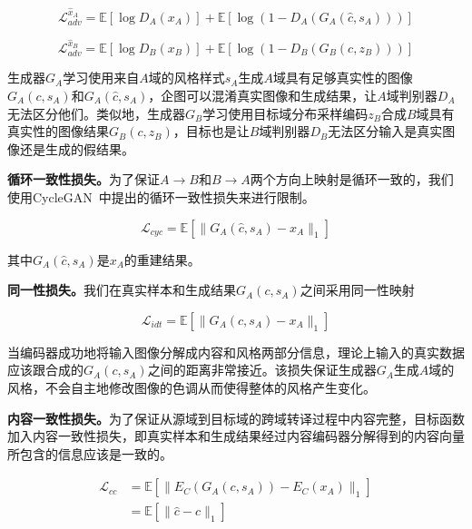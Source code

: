 \begin{equation}
\label{equ:adv_a}
\mathcal{L}_{adv}^{\hat{x}_A} = \mathbb{E}[\log D_A(x_A)] + \mathbb{E}[\log(1-D_A(G_A(\hat{c},s_A)))]
\end{equation}

\begin{equation}
\label{equ:adv_b}
\mathcal{L}_{adv}^{\hat{x}_B} = \mathbb{E}[\log D_B(x_B)] + \mathbb{E}[\log(1-D_B(G_B(c,z_B)))]
\end{equation}

生成器$G_A$学习使用来自$A$域的风格样式$s_A$生成$A$域具有足够真实性的图像$G_A(c,s_A)$和$G_A(\hat{c},s_A)$，企图可以混淆真实图像和生成结果，让$A$域判别器$D_A$无法区分他们。类似地，生成器$G_B$学习使用目标域分布采样编码$z_B$合成$B$域具有真实性的图像结果$G_B(c,z_B)$，目标也是让$B$域判别器$D_B$无法区分输入是真实图像还是生成的假结果。

\textbf{循环一致性损失。}为了保证$A \rightarrow B$和$B \rightarrow A$两个方向上映射是循环一致的，我们使用CycleGAN~\cite{zhu2017unpaired}中提出的循环一致性损失来进行限制。

\begin{equation}
\label{equ:cycle}
\mathcal{L}_{cyc} = \mathbb{E}[\| G_A(\hat{c}, s_A) - x_A \|_1]
\end{equation}

其中$G_A(\hat{c}, s_A)$是$x_A$的重建结果。

\textbf{同一性损失。}我们在真实样本和生成结果$G_A(c,s_A)$之间采用同一性映射

\begin{equation}
\label{equ:idt}
\mathcal{L}_{idt} = \mathbb{E}[\| G_A(c, s_A) - x_A \|_1]
\end{equation}

当编码器成功地将输入图像分解成内容和风格两部分信息，理论上输入的真实数据应该跟合成的$G_A(c,s_A)$之间的距离非常接近。该损失保证生成器$G_A$生成$A$域的风格，不会自主地修改图像的色调从而使得整体的风格产生变化。

\textbf{内容一致性损失。}为了保证从源域到目标域的跨域转译过程中内容完整，目标函数加入内容一致性损失，即真实样本和生成结果经过内容编码器分解得到的内容向量所包含的信息应该是一致的。

\begin{equation}
\label{equ:cc}
\begin{aligned}
\mathcal{L}_{cc} & = \mathbb{E}[\| E_C(G_A(c, s_A)) - E_C(x_A) \|_1] \\
       & = \mathbb{E}[\| \hat{c} - c \|_1]
\end{aligned}
\end{equation}

